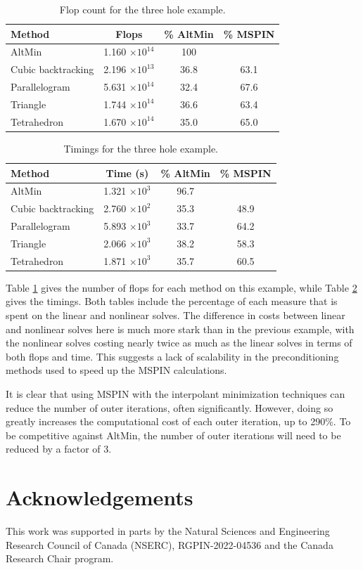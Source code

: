 \documentclass{article}
\numberwithin{equation}{section}
\begin{document}
\begin{table}
	\centering
	\begin{tabular}{l | c c c}
	Method & Flops & \% AltMin & \% MSPIN \\ \hline
	AltMin & 1.160 $\times 10^{14}$ & 100 \\
	Cubic backtracking & 2.196 $\times 10^{13}$ & 36.8 & 63.1 \\
	Parallelogram & 5.631 $\times 10^{14}$ & 32.4 & 67.6 \\
	Triangle & 1.744 $\times 10^{14}$ & 36.6 & 63.4 \\
	Tetrahedron & 1.670 $\times 10^{14}$ & 35.0 & 65.0
	\end{tabular}
	\caption{Flop count for the three hole example.}
	\label{tab: ctfm flops}
\end{table}
\begin{table}
	\centering
	\begin{tabular}{l | c c c}
	Method & Time (s) & \% AltMin & \% MSPIN \\ \hline
	AltMin & 1.321 $\times 10^3$ & 96.7 \\
	Cubic backtracking & 2.760 $\times 10^2$ & 35.3 & 48.9 \\
	Parallelogram & 5.893 $\times 10^3$ & 33.7 & 64.2 \\
	Triangle & 2.066 $\times 10^3$ & 38.2 & 58.3 \\
	Tetrahedron & 1.871 $\times 10^3$ & 35.7 & 60.5
	\end{tabular}
	\caption{Timings for the three hole example.}
	\label{tab: ctfm time}
\end{table}
Table \ref{tab: ctfm flops} gives the number of flops for each method on this example, while Table \ref{tab: ctfm time} gives the timings.
Both tables include the percentage of each measure that is spent on the linear and nonlinear solves.
The difference in costs between linear and nonlinear solves here is much more stark than in the previous example, with the nonlinear solves costing nearly twice as much as the linear solves in terms of both flops and time.
This suggests a lack of scalability in the preconditioning methods used to speed up the MSPIN calculations.

It is clear that using MSPIN with the interpolant minimization techniques can reduce the number of outer iterations, often significantly.
However, doing so greatly increases the computational cost of each outer iteration, up to 290\%.
To be competitive against AltMin, the number of outer iterations will need to be reduced by a factor of 3.

\section*{Acknowledgements}
This work was supported in parts by the Natural Sciences and Engineering Research Council of Canada (NSERC), RGPIN-2022-04536 and the Canada Research Chair program.

% 
% 

\printbibliography
\end{document}
